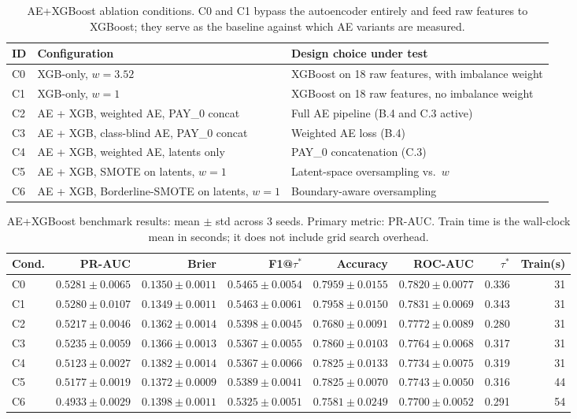 \documentclass[12pt,a4paper]{article}
\begin{document}
\begin{table}[H]
\centering
\caption{AE+XGBoost ablation conditions. C0 and C1 bypass the autoencoder
         entirely and feed raw features to XGBoost; they serve as the
         baseline against which AE variants are measured.}
\label{tab:ae_conditions}
\begin{tabularx}{\textwidth}{llX}
\toprule
ID & Configuration & Design choice under test \\
\midrule
C0 & XGB-only, $w = 3.52$ & XGBoost on 18 raw features, with imbalance weight \\
C1 & XGB-only, $w = 1$    & XGBoost on 18 raw features, no imbalance weight \\
C2 & AE + XGB, weighted AE, PAY\_0 concat & Full AE pipeline (B.4 and C.3 active) \\
C3 & AE + XGB, class-blind AE, PAY\_0 concat & Weighted AE loss (B.4) \\
C4 & AE + XGB, weighted AE, latents only & PAY\_0 concatenation (C.3) \\
C5 & AE + XGB, SMOTE on latents, $w = 1$ & Latent-space oversampling vs.\ $w$ \\
C6 & AE + XGB, Borderline-SMOTE on latents, $w = 1$ & Boundary-aware oversampling \\
\bottomrule
\end{tabularx}
\end{table}

\begin{table}[H]
\centering
\caption{AE+XGBoost benchmark results: mean $\pm$ std across 3 seeds.
         Primary metric: PR-AUC. Train time is the wall-clock mean in
         seconds; it does not include grid search overhead.}
\label{tab:ae_results}
\small
\begin{tabular}{lrrrrrrr}
\toprule
Cond. & PR-AUC & Brier & F1@$\tau^*$ & Accuracy & ROC-AUC & $\tau^*$ & Train(s) \\
\midrule
C0 & $0.5281 \pm 0.0065$ & $0.1350 \pm 0.0011$ & $0.5465 \pm 0.0054$ & $0.7959 \pm 0.0155$ & $0.7820 \pm 0.0077$ & 0.336 & 31 \\
C1 & $0.5280 \pm 0.0107$ & $0.1349 \pm 0.0011$ & $0.5463 \pm 0.0061$ & $0.7958 \pm 0.0150$ & $0.7831 \pm 0.0069$ & 0.343 & 31 \\
C2 & $0.5217 \pm 0.0046$ & $0.1362 \pm 0.0014$ & $0.5398 \pm 0.0045$ & $0.7680 \pm 0.0091$ & $0.7772 \pm 0.0089$ & 0.280 & 31 \\
C3 & $0.5235 \pm 0.0059$ & $0.1366 \pm 0.0013$ & $0.5367 \pm 0.0055$ & $0.7860 \pm 0.0103$ & $0.7764 \pm 0.0068$ & 0.317 & 31 \\
C4 & $0.5123 \pm 0.0027$ & $0.1382 \pm 0.0014$ & $0.5367 \pm 0.0066$ & $0.7825 \pm 0.0133$ & $0.7734 \pm 0.0075$ & 0.319 & 31 \\
C5 & $0.5177 \pm 0.0019$ & $0.1372 \pm 0.0009$ & $0.5389 \pm 0.0041$ & $0.7825 \pm 0.0070$ & $0.7743 \pm 0.0050$ & 0.316 & 44 \\
C6 & $0.4933 \pm 0.0029$ & $0.1398 \pm 0.0011$ & $0.5325 \pm 0.0051$ & $0.7581 \pm 0.0249$ & $0.7700 \pm 0.0052$ & 0.291 & 54 \\
\bottomrule
\end{tabular}
\end{table}
\end{document}
